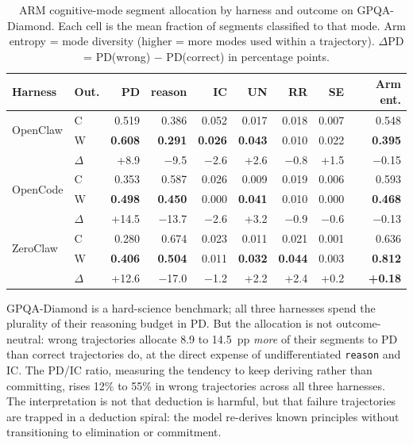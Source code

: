 \begin{table}[t]
\centering
\small
\caption{%
  ARM cognitive-mode segment allocation by harness and outcome on GPQA-Diamond.
  Each cell is the mean fraction of segments classified to that mode.
  Arm entropy = mode diversity (higher = more modes used within a trajectory).
  $\Delta$PD = PD(wrong) $-$ PD(correct) in percentage points.
}
\label{tab:gpqa-arm-modes}
\setlength{\tabcolsep}{3pt}
\begin{tabular}{llrrrrrrr}
\toprule
Harness & Out. & PD & reason & IC & UN & RR & SE & Arm ent. \\
\midrule
\multirow{2}{*}{OpenClaw}
  & C & 0.519 & 0.386 & 0.052 & 0.017 & 0.018 & 0.007 & 0.548 \\
  & W & \textbf{0.608} & \textbf{0.291} & \textbf{0.026} & \textbf{0.043} & 0.010 & 0.022 & \textbf{0.395} \\
  & $\Delta$ & +8.9 & $-$9.5 & $-$2.6 & +2.6 & $-$0.8 & +1.5 & $-$0.15 \\
\midrule
\multirow{2}{*}{OpenCode}
  & C & 0.353 & 0.587 & 0.026 & 0.009 & 0.019 & 0.006 & 0.593 \\
  & W & \textbf{0.498} & \textbf{0.450} & 0.000 & \textbf{0.041} & 0.010 & 0.000 & \textbf{0.468} \\
  & $\Delta$ & +14.5 & $-$13.7 & $-$2.6 & +3.2 & $-$0.9 & $-$0.6 & $-$0.13 \\
\midrule
\multirow{2}{*}{ZeroClaw}
  & C & 0.280 & 0.674 & 0.023 & 0.011 & 0.021 & 0.001 & 0.636 \\
  & W & \textbf{0.406} & \textbf{0.504} & 0.011 & \textbf{0.032} & \textbf{0.044} & 0.003 & \textbf{0.812} \\
  & $\Delta$ & +12.6 & $-$17.0 & $-$1.2 & +2.2 & +2.4 & +0.2 & \textbf{+0.18} \\
\bottomrule
\end{tabular}
\end{table}


GPQA-Diamond is a hard-science benchmark; all three harnesses spend the
plurality of their reasoning budget in PD.
But the allocation is not outcome-neutral: wrong trajectories allocate 8.9 to
14.5~pp \emph{more} of their segments to PD than correct trajectories do, at
the direct expense of undifferentiated \texttt{reason} and IC.
The PD/IC ratio, measuring the tendency to keep deriving rather than committing,
rises 12\% to 55\% in wrong trajectories across all three harnesses.
The interpretation is not that deduction is harmful, but that failure
trajectories are trapped in a deduction spiral: the model re-derives known
principles without transitioning to elimination or commitment.

